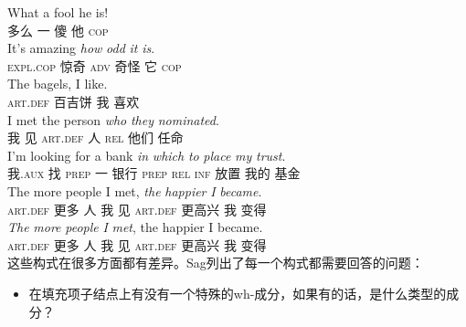\begin{exe}
\begin{xlist}[iv.]
\begin{exe}
\begin{xlist}[iv.]
\eal
\ex
\gll What a fool he is!\\
     多么 一 傻 他 \textsc{cop}\\
\ex
\gll It's amazing \emph{how} \emph{odd} \emph{it} \emph{is}.\\
     \textsc{expl}.\textsc{cop} 惊奇 \textsc{adv} 奇怪 它 \textsc{cop}\\
\zl
\ea
\gll The bagels, I like.\\
     \textsc{art}.\textsc{def} 百吉饼 我 喜欢\\
\z
\eal
\ex
\gll I met the person \emph{who} \emph{they} \emph{nominated}.\\
     我 见 \textsc{art}.\textsc{def} 人 \textsc{rel} 他们 任命\\
\ex
\gll I'm looking for a bank \emph{in} \emph{which} \emph{to} \emph{place} \emph{my} \emph{trust}.\\
     我.\textsc{aux} 找 \textsc{prep} 一 银行 \textsc{prep} \textsc{rel} \textsc{inf} 放置 我的 基金\\
\zl
\eal
\ex
\gll The more people I met, \emph{the} \emph{happier} \emph{I} \emph{became}.\\
     \textsc{art}.\textsc{def} 更多 人 我 见 \textsc{art}.\textsc{def} 更高兴 我 变得\\
\ex 
\gll \emph{The} \emph{more} \emph{people} \emph{I} \emph{met}, the happier I became.\\
     \textsc{art}.\textsc{def} 更多 人 我 见 \textsc{art}.\textsc{def} 更高兴 我 变得\\
\zl
这些构式在很多方面都有差异。Sag列出了每一个构式都需要回答的问题：
\begin{itemize}
\item 在填充项子结点上有没有一个特殊的wh-成分，如果有的话，是什么类型的成分？

\end{itemize}
\end{xlist}
\end{exe}
\end{xlist}
\end{exe}
